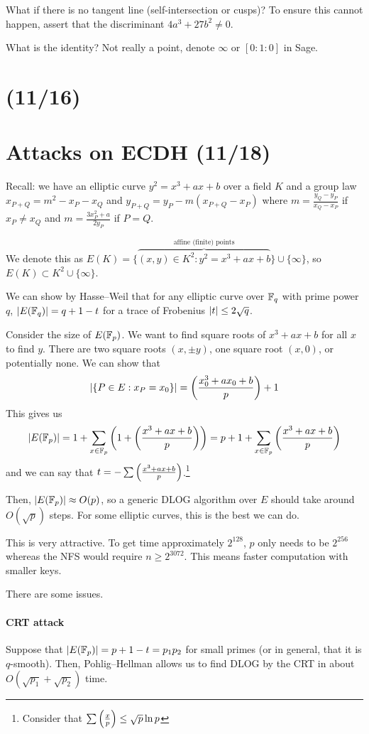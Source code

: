 \documentclass[notes]{agony}
\newcommand{\leg}[2]{\qty(\frac{#1}{#2})}
\begin{document}
What if there is no tangent line (self-intersection or cusps)?
To ensure this cannot happen, assert that the discriminant $4a^3 + 27b^2 \neq 0$.

What is the identity? Not really a point, denote $\infty$ or $[0:1:0]$ in Sage.

\section{(11/16)}

\section{Attacks on ECDH (11/18)}

Recall: we have an elliptic curve $y^2 = x^3 + ax + b$ over a field $K$
and a group law $x_{P+Q} = m^2 - x_P - x_Q$ and $y_{P+Q} = y_P - m(x_{P+Q}-x_P)$
where $m = \frac{y_Q - y_P}{x_Q - x_P}$ if $x_P \neq x_Q$
and $m = \frac{3x_P^2+a}{2y_P}$ if $P = Q$.

We denote this as $E(K) = \{\overbrace{(x,y) \in K^2 : y^2 = x^3 + ax + b}^{\text{affine (finite) points}}\} \cup \{\infty\}$,
so $E(K) \subset K^2 \cup \{\infty\}$.

We can show by Hasse--Weil that for any elliptic curve over $\mathbb{F}_q$
with prime power $q$, $\abs{E(\mathbb{F}_q)} = q + 1 - t$ for a trace of Frobenius $\abs{t} \leq 2\sqrt{q}$.

Consider the size of $E(\mathbb{F}_p)$.
We want to find square roots of $x^3+ax+b$ for all $x$ to find $y$.
There are two square roots $(x, \pm y)$, one square root $(x, 0)$, or potentially none.
We can show that \[ \abs{\{P \in E : x_P = x_0\}} = \leg{x_0^3+ax_0+b}{p}+1 \]
This gives us \[
  \abs{E(\F_p)} = 1 + \sum_{x \in \F_p}\qty(1 + \leg{x^3+ax+b}{p})
  = p + 1 + \sum_{x \in \F_p}\leg{x^3+ax+b}{p}
\]
and we can say that $t = -\sum\leg{x^3+ax+b}{p}$.\footnote{Consider that $\sum\leg{x}{p} \leq \sqrt{p}\ln p$}

Then, $\abs{E(\mathbb{F}_p)} \approx O(p)$,
so a generic DLOG algorithm over $E$ should take around $O(\sqrt{p})$ steps.
For some elliptic curves, this is the best we can do.

This is very attractive.
To get time approximately $2^{128}$, $p$ only needs to be $2^{256}$
whereas the NFS would require $n \geq 2^{3072}$.
This means faster computation with smaller keys.

There are some issues.

\paragraph{CRT attack}
Suppose that $\abs{E(\mathbb{F}_p)} = p+1-t = p_1p_2$ for small primes
(or in general, that it is $q$-smooth).
Then, Pohlig--Hellman allows us to find DLOG by the CRT
in about $O(\sqrt{p_1}+\sqrt{p_2})$ time.
\end{document}
